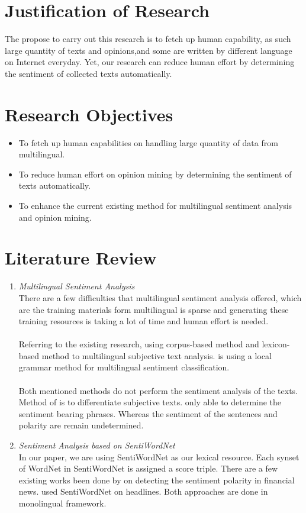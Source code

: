 \documentclass[a4papaer.12pt]{article}
\begin{document}
\pagebreak
\section*{\textbf{Justification of Research}}
The propose to carry out this research is to fetch up human capability, as such large quantity of texts and opinions,and some are written by different language on Internet everyday. Yet, our research can reduce human effort by determining the sentiment of collected texts automatically.

\section*{\textbf{Research Objectives}}
\begin{itemize}
\item To fetch up human capabilities on handling large quantity of data from multilingual.
\item To reduce human effort on opinion mining by determining the sentiment of texts automatically.
\item To enhance the current existing method for multilingual sentiment analysis and opinion mining.
\end{itemize}

\section*{\textbf{Literature Review}}
\begin{enumerate}[I]
\item \textit{Multilingual Sentiment Analysis}
\\
There are a few difficulties that multilingual sentiment analysis offered, which are the training materials form multilingual is sparse and generating these training resources is taking a lot of time and human effort is needed. 
\\
\\
Referring to the existing research, \cite{mihalcea2007learning} using corpus-based method and lexicon-based method to multilingual subjective text analysis. \cite{almas2007note} is using a local grammar method for multilingual sentiment classification. 
\\
\\Both mentioned methods do not perform the sentiment analysis of the texts. Method of \cite{mihalcea2007learning} is to differentiate subjective texts. \cite{almas2007note} only able to determine the sentiment bearing phrases. Whereas the sentiment of the sentences and polarity are remain undetermined. 
\\
\item \textit{Sentiment Analysis based on SentiWordNet}
\\
In our paper, we are using SentiWordNet as our lexical resource. Each synset of WordNet in SentiWordNet is assigned a score triple. There are a few existing works been done by \cite{devitt2007sentiment} on detecting the sentiment polarity in financial news. \cite{chaumartin2007upar7} used SentiWordNet on headlines. Both approaches are done in monolingual framework.
\end{enumerate}
\end{document}
